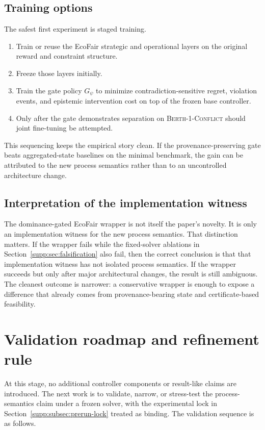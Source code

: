 \documentclass[11pt]{article}
\newcommand{\1}{\mathbf{1}}
\theoremstyle{definition}
\theoremstyle{plain}
\theoremstyle{remark}
\begin{document}
\subsection{Training options}

The safest first experiment is staged training.
\begin{enumerate}[leftmargin=1.7em,label=\arabic*.]
\item Train or reuse the EcoFair strategic and operational layers on the original reward and constraint structure.
\item Freeze those layers initially.
\item Train the gate policy $G_{\psi}$ to minimize contradiction-sensitive regret, violation events, and epistemic intervention cost on top of the frozen base controller.
\item Only after the gate demonstrates separation on \textsc{Berth-1-Conflict} should joint fine-tuning be attempted.
\end{enumerate}

This sequencing keeps the empirical story clean. If the provenance-preserving gate beats aggregated-state baselines on the minimal benchmark, the gain can be attributed to the new process semantics rather than to an uncontrolled architecture change.

\subsection{Interpretation of the implementation witness}

The dominance-gated EcoFair wrapper is not itself the paper's novelty. It is only an implementation witness for the new process semantics. That distinction matters. If the wrapper fails while the fixed-solver ablations in Section~\ref{supp:sec:falsification} also fail, then the correct conclusion is that that implementation witness has not isolated process semantics. If the wrapper succeeds but only after major architectural changes, the result is still ambiguous. The cleanest outcome is narrower: a conservative wrapper is enough to expose a difference that already comes from provenance-bearing state and certificate-based feasibility.

\section{Validation roadmap and refinement rule}
\label{supp:sec:next}

At this stage, no additional controller components or result-like claims are introduced. The next work is to validate, narrow, or stress-test the process-semantics claim under a frozen solver, with the experimental lock in Section~\ref{supp:subsec:prerun-lock} treated as binding. The validation sequence is as follows.
\end{document}
